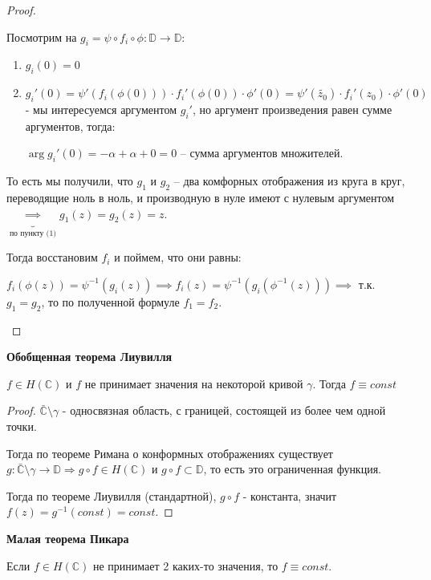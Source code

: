 \begin{proof}
\begin{enumerate}
{            Посмотрим на $g_i = \psi \circ f_i \circ \phi: \mathbb{D} \rightarrow \mathbb{D}$:

            \begin{enumerate}
                \item $g_i(0) = 0$
                \item {
                    $g_i'(0) = \psi'(f_i(\phi(0))) \cdot f_i'(\phi(0)) \cdot \phi'(0) = \psi'(\tilde{z_0}) \cdot f_i'(z_0) \cdot\phi'(0)$ - мы интересуемся аргументом $g_i'$, но аргумент произведения равен сумме аргументов, тогда:

                    $\arg g_i'(0) = -\alpha + \alpha + 0 = 0$ -- сумма аргументов множителей.
                }
            \end{enumerate}

            То есть мы получили, что $g_1$ и $g_2$ -- два комфорных отображения из круга в круг, переводящие ноль в ноль, и производную в нуле имеют с нулевым аргументом $\underbrace{\implies}_{\text{по пункту (1)}} g_1(z) = g_2(z) = z$.

            Тогда восстановим $f_i$ и поймем, что они равны:

            $f_i(\phi(z)) = \psi^{-1}(g_i(z)) \implies f_i(z) = \psi^{-1}(g_i(\phi^{-1}(z))) \implies$ т.к. $g_1 = g_2$, то по полученной формуле $f_1 = f_2$.
        }
    \end{enumerate}
\end{proof}

\begin{consequence}
    \textbf{Обобщенная теорема Лиувилля}

    $f \in H(\mathbb{C})$ и $f$ не принимает значения на некоторой кривой $\gamma$. Тогда
    $f \equiv const$
\end{consequence}

\begin{proof}
    $\bar{\mathbb{C}} \setminus \gamma$ - односвязная область, с границей, состоящей из более чем одной точки.

    Тогда по теореме Римана о конформных отображениях существует $g : \bar{\mathbb{C}} \setminus \gamma \to \mathbb{D} \Rightarrow g \circ f \in H(\mathbb{C})$ и $g \circ f \subset \mathbb{D}$, то есть
    это ограниченная функция.

    Тогда по теореме Лиувилля (стандартной), $g \circ f$ - константа, значит
    $f(z) = g^{-1} (const) = const$.
\end{proof}

\begin{remark}
    \textbf{Малая теорема Пикара}

    Если $f \in H(\mathbb{C})$ не принимает 2 каких-то значения, то
    $f \equiv const$.
\end{remark}

